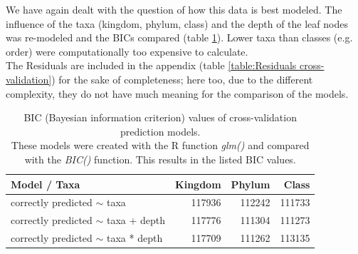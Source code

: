       We have again dealt with the question of how this data is best modeled. The influence of the taxa 
        (kingdom, phylum, class) and the depth of the leaf nodes was re-modeled and the BICs compared 
        (table \ref{table:BIC cross-validation}). Lower taxa than classes (e.g. order) were 
        computationally too expensive to calculate. \\
      The Residuals are included in the appendix (table \ref{table:Residuals cross-validation}) for the 
        sake of completeness; here too, due to the different complexity, they do not have much meaning 
        for the comparison of the models. \\


      \begin{table}[h]
        \begin{center}
          \begin{tabular}{ |l|r|r|r| }
            \hline
            \bfseries Model / Taxa & \bfseries Kingdom & \bfseries Phylum & \bfseries Class \\%
            \hline \hline
            correctly predicted $\sim$ taxa & 117936 & \cellcolor{green!40}112242 & \cellcolor{green!50}111733 \\%
            \hline
            correctly predicted $\sim$ taxa + depth & 117776 & \cellcolor{green!50}111304 & \cellcolor{green!50}111273 \\%
            \hline
            correctly predicted $\sim$ taxa * depth & 117709 & \cellcolor{green!50}111262 & \cellcolor{green!30}113135 \\%
            \hline
          \end{tabular} 
        \end{center}
        \caption{BIC (Bayesian information criterion) values of cross-validation prediction models. \\
          These models were created with the R function \textit{glm()} and compared with the 
            \textit{BIC()} function. This results in the listed BIC values.}
        \label{table:BIC cross-validation} 
      \end{table}

